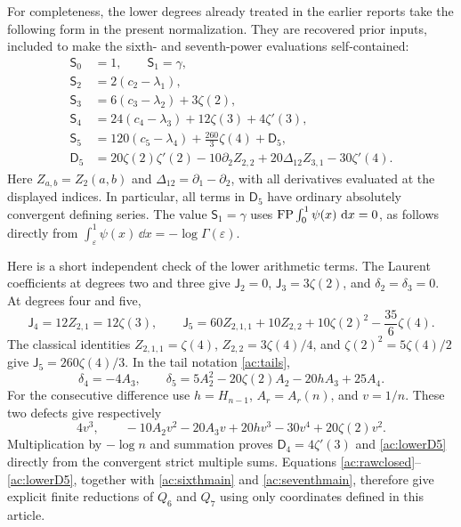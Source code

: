 For completeness, the lower degrees already treated in the earlier
reports \cite{Higher,Fifth} take the following form in the
present normalization. They are recovered prior inputs, included to
make the sixth- and seventh-power evaluations self-contained:
\begin{align}
 \mathsf S_0&=1,\qquad \mathsf S_1=\gamma,
       \label{ac:lowerinitial}\\
 \mathsf S_2&=2(c_2-\lambda_1),\nonumber\\
 \mathsf S_3&=6(c_3-\lambda_2)+3\zeta(2),\nonumber\\
 \mathsf S_4&=24(c_4-\lambda_3)+12\zeta(3)+4\zeta'(3),\nonumber\\
 \mathsf S_5&=120(c_5-\lambda_4)+\frac{260}{3}\zeta(4)
                     +\mathsf D_5,\label{ac:lowernormalized}\\
 \mathsf D_5&=20\zeta(2)\zeta'(2)-10\partial_2Z_{2,2}
       +20\Delta_{12}Z_{3,1}-30\zeta'(4).
       \label{ac:lowerD5}
\end{align}
Here $Z_{a,b}=Z_2(a,b)$ and
$\Delta_{12}=\partial_1-\partial_2$, with all derivatives evaluated
at the displayed indices. In particular, all terms in
$\mathsf D_5$ have ordinary absolutely convergent defining series.
The value $\mathsf S_1=\gamma$ uses
$\operatorname{FP}\int_0^1\psi(x)\,\,\mathrm d x=0$, as follows directly from
$\int_\varepsilon^1\psi(x)\,\dd x=-\log\Gamma(\varepsilon)$.

Here is a short independent check of the lower arithmetic terms.
The Laurent coefficients at degrees two and three give
$\mathsf J_2=0$, $\mathsf J_3=3\zeta(2)$, and
$\delta_2=\delta_3=0$. At degrees four and five,
\[
 \mathsf J_4=12Z_{2,1}=12\zeta(3),\qquad
 \mathsf J_5=60Z_{2,1,1}+10Z_{2,2}
                 +10\zeta(2)^2-\frac{35}{6}\zeta(4).
\]
The classical identities $Z_{2,1,1}=\zeta(4)$,
$Z_{2,2}=3\zeta(4)/4$, and
$\zeta(2)^2=5\zeta(4)/2$ give
$\mathsf J_5=260\zeta(4)/3$.
In the tail notation \eqref{ac:tails},
\[
 \delta_4=-4A_3,\qquad
 \delta_5=5A_2^2-20\zeta(2)A_2-20hA_3+25A_4.
\]
For the consecutive difference use $h=H_{n-1}$,
$A_r=A_r(n)$, and $v=1/n$. These two defects give respectively
\[
 4v^3,\qquad
 -10A_2v^2-20A_3v+20hv^3-30v^4+20\zeta(2)v^2.
\]
Multiplication by $-\log n$ and summation proves
$\mathsf D_4=4\zeta'(3)$ and \eqref{ac:lowerD5} directly from
the convergent strict multiple sums. Equations
\eqref{ac:rawclosed}--\eqref{ac:lowerD5}, together with
\eqref{ac:sixthmain} and \eqref{ac:seventhmain}, therefore give
explicit finite reductions of $Q_6$ and $Q_7$ using only coordinates
defined in this article.

